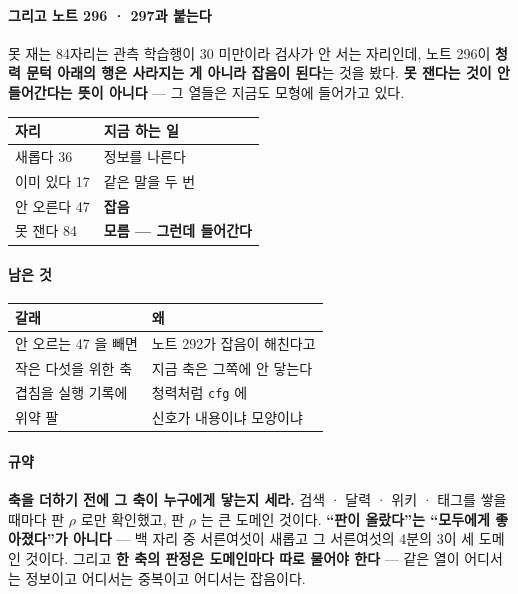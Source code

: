 \documentclass[10pt]{article}
\begin{document}
\paragraph{그리고 노트 296 · 297과 붙는다} 못 재는 84자리는 관측 학습행이
30 미만이라 검사가 안 서는 자리인데, 노트 296이 \textbf{청력 문턱 아래의
행은 사라지는 게 아니라 잡음이 된다}는 것을 봤다. \textbf{못 잰다는 것이
안 들어간다는 뜻이 아니다} --- 그 열들은 지금도 모형에 들어가고 있다.

\begin{center}\small
\begin{tabular}{ll}
\hline
자리 & 지금 하는 일 \\
\hline
새롭다 36 & 정보를 나른다 \\
이미 있다 17 & 같은 말을 두 번 \\
안 오른다 47 & \textbf{잡음} \\
못 잰다 84 & \textbf{모름 --- 그런데 들어간다} \\
\hline
\end{tabular}
\end{center}

\paragraph{남은 것}
\begin{center}\small
\begin{tabular}{ll}
\hline
갈래 & 왜 \\
\hline
안 오르는 47 을 빼면 & 노트 292가 잡음이 해친다고 \\
작은 다섯을 위한 축 & 지금 축은 그쪽에 안 닿는다 \\
겹침을 실행 기록에 & 청력처럼 \texttt{cfg} 에 \\
위약 팔 & 신호가 내용이냐 모양이냐 \\
\hline
\end{tabular}
\end{center}

\paragraph{규약} \textbf{축을 더하기 전에 그 축이 누구에게 닿는지 세라.}
검색 · 달력 · 위키 · 태그를 쌓을 때마다 판 $\rho$ 로만 확인했고, 판 $\rho$ 는
큰 도메인 것이다. \textbf{``판이 올랐다''는 ``모두에게 좋아졌다''가 아니다}
--- 백 자리 중 서른여섯이 새롭고 그 서른여섯의 4분의 3이 세 도메인 것이다.
그리고 \textbf{한 축의 판정은 도메인마다 따로 물어야 한다} --- 같은 열이
어디서는 정보이고 어디서는 중복이고 어디서는 잡음이다.
\end{document}
